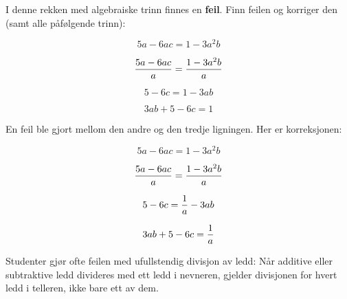 

I denne rekken med algebraiske trinn finnes en {\bf feil}. Finn feilen og korriger den (samt alle påfølgende trinn):

$$5a - 6ac = 1 - 3a^2b$$

$${{5a - 6ac} \over a} = {{1 - 3a^2b} \over a}$$

$$5 - 6c = 1 - 3ab$$

$$3ab + 5 - 6c = 1$$







En feil ble gjort mellom den andre og den tredje ligningen. Her er korreksjonen:

$$5a - 6ac = 1 - 3a^2b$$

$${{5a - 6ac} \over a} = {{1 - 3a^2b} \over a}$$

$$5 - 6c = {1 \over a} - 3ab$$

$$3ab + 5 - 6c = {1 \over a}$$







Studenter gjør ofte feilen med ufullstendig divisjon av ledd: Når additive eller subtraktive ledd divideres med ett ledd i nevneren, gjelder divisjonen for hvert ledd i telleren, ikke bare ett av dem.



